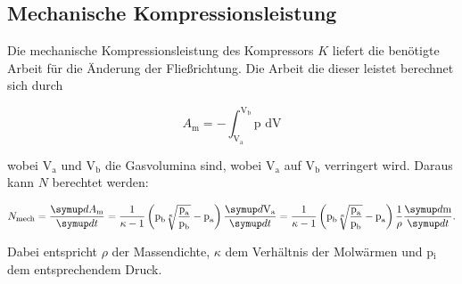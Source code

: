 \subsection{Mechanische Kompressionsleistung}

Die mechanische Kompressionsleistung des Kompressors $K$ liefert die benötigte Arbeit für die Änderung der Fließrichtung.
Die Arbeit die dieser leistet berechnet sich durch

\begin{equation}
    A_{\text{m}} = - \int_{\text{V}_\text{a}}^{\text{V}_\text{b}} \text{p dV} 
\end{equation}

wobei $\text{V}_\text{a}$ und $\text{V}_\text{b}$ die Gasvolumina sind, wobei $\text{V}_\text{a}$ auf $\text{V}_\text{b}$ verringert wird.
Daraus kann $N$ berechtet werden: %

\begin{equation} \label{eq:n_mech}
    N_\text{mech} = \frac{\dif{A_{\text{m}}}} {\dif{t}}
    = \frac{1}{\kappa - 1} \left(\text{p}_\text{b} \sqrt[\kappa]{\frac{\text{p}_\text{a}}{\text{p}_\text{b}}
    } - \text{p}_\text{a} \right) \frac{\dif{\text{V}_\text{a}}}{\dif{t}}
    = \frac{1}{\kappa - 1} \left(\text{p}_\text{b} \sqrt[\kappa]{\frac{\text{p}_\text{a}}{\text{p}_\text{b}}
    } - \text{p}_\text{a} \right) \frac{1}{\rho} \frac{\dif{\text{m}}}{\dif{t}}.
\end{equation}

Dabei entspricht $\rho$ der Massendichte, $\kappa$ dem Verhältnis der Molwärmen und p$_\text{i}$ 
dem entsprechendem Druck.

